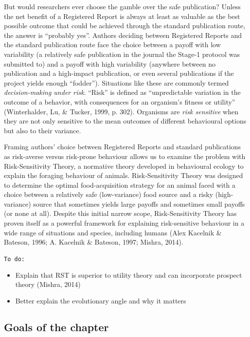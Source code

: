 \documentclass[
  ,man,mask,floatsintext]{apa6}
\providecommand{\tightlist}{%
  \setlength{\itemsep}{0pt}\setlength{\parskip}{0pt}}
\begin{document}
But would researchers ever choose the gamble over the safe publication?
Unless the net benefit of a Registered Report is always at least as valuable as the best possible outcome that could be achieved through the standard publication route, the answer is ``probably yes''.
Authors deciding between Registered Reports and the standard publication route face the choice between a payoff with low variability (a relatively safe publication in the journal the Stage-1 protocol was submitted to) and a payoff with high variability (anywhere between no publication and a high-impact publication, or even several publications if the project yields enough ``fodder'').
Situations like these are commonly termed \emph{decision-making under risk}.
``Risk'' is defined as ``unpredictable variation in the outcome of a behavior, with consequences for an organism's fitness or utility'' (Winterhalder, Lu, \& Tucker, 1999, p. 302).
Organisms are \emph{risk sensitive} when they are not only sensitive to the mean outcomes of different behavioural options but also to their variance.

Framing authors' choice between Registered Reports and standard publications as risk-averse versus risk-prone behaviour allows us to examine the problem with Risk-Sensitivity Theory, a normative theory developed in behavioural ecology to explain the foraging behaviour of animals.
Risk-Sensitivity Theory was designed to determine the optimal food-acquisition strategy for an animal faced with a choice between a relatively safe (low-variance) food source and a risky (high-variance) source that sometimes yields large payoffs and sometimes small payoffs (or none at all).
Despite this initial narrow scope, Risk-Sensitivity Theory has proven itself as a powerful framework for explaining risk-sensitive behaviour in a wide range of situations and species, including humans (Alex Kacelnik \& Bateson, 1996; A. Kacelnik \& Bateson, 1997; Mishra, 2014).

\texttt{To\ do:}

\begin{itemize}
\tightlist
\item
  Explain that RST is superior to utility theory and can incorporate prospect theory (Mishra, 2014)
\item
  Better explain the evolutionary angle and why it matters
\end{itemize}

\hypertarget{goals-of-the-chapter}{%
\subsection{Goals of the chapter}\label{goals-of-the-chapter}}
\end{document}
